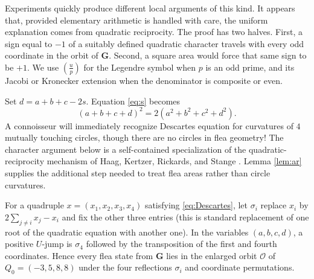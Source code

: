 \documentclass[12pt]{article}
\theoremstyle{definition}
\theoremstyle{remark}
\newcommand{\mG}{\mathbf G}
\newcommand{\OO}{\mathcal O}
\newcommand{\symb}[2]{\left(\frac{#1}{#2}\right)}
\begin{document}
 Experiments quickly produce different local arguments of this kind. It appears that, provided elementary arithmetic is handled with care, the uniform explanation comes from quadratic reciprocity. The proof has two halves. First, a sign equal to $-1$ of a suitably defined quadratic character travels with every odd coordinate in the orbit of $\mG
$. Second, a square area would force that same sign to be $+1$. We use $\symb{u}{p}$ for the Legendre symbol when $p$ is an odd prime, and its Jacobi or Kronecker extension when the denominator is composite or even. 

Set $d=a+b+c-2s$. Equation \eqref{eq:s} becomes
\begin{equation}\label{eq:Descartes}
(a+b+c+d)^2=2(a^2+b^2+c^2+d^2).
\end{equation}
A connoisseur will immediately recognize Descartes equation for curvatures of $4$ mutually touching circles, though there are no circles in flea geometry! The character argument below is a self-contained specialization of the quadratic-reciprocity mechanism of Haag, Kertzer, Rickards, and Stange \cite{HKRS}. Lemma \ref{lem:ar} supplies the additional step needed to treat flea areas rather than circle curvatures.

For a quadruple $x=(x_1,x_2,x_3,x_4)$ satisfying
\eqref{eq:Descartes}, let $\sigma_i$ replace $x_i$ by
$2\sum_{j\ne i}x_j-x_i$ and fix the other three entries (this is standard replacement of one root of the quadratic equation with another one). In the variables
$(a,b,c,d)$, a positive $U$-jump is $\sigma_4$ followed by the transposition
of the first and fourth coordinates. Hence every flea state from $\mG$ lies
in the enlarged orbit $\OO$ of $Q_0=(-3,5,8,8)$ under the four reflections
$\sigma_i$ and coordinate permutations.
\end{document}
